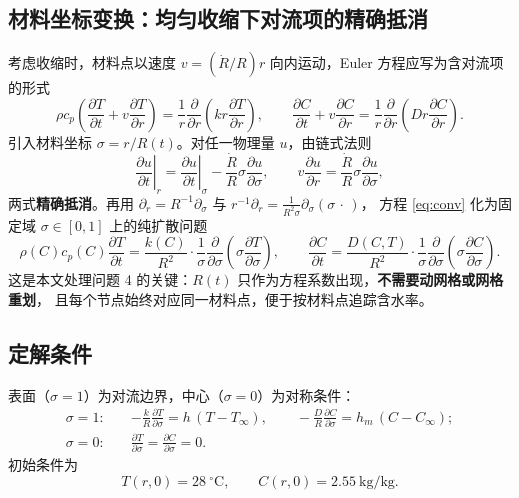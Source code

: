 \documentclass[12pt,a4paper]{ctexart}
\begin{document}
\subsection{材料坐标变换：均匀收缩下对流项的精确抵消}
考虑收缩时，材料点以速度 $v=(\dot R/R)r$ 向内运动，Euler 方程应写为含对流项的形式
\begin{equation}
\rho c_p\!\left(\frac{\partial T}{\partial t}+v\frac{\partial T}{\partial r}\right)
=\frac{1}{r}\frac{\partial}{\partial r}\!\left(k r\frac{\partial T}{\partial r}\right),
\qquad
\frac{\partial C}{\partial t}+v\frac{\partial C}{\partial r}
=\frac{1}{r}\frac{\partial}{\partial r}\!\left(D r\frac{\partial C}{\partial r}\right).
\label{eq:conv}
\end{equation}
引入材料坐标 $\sigma=r/R(t)$。对任一物理量 $u$，由链式法则
\begin{equation}
\left.\frac{\partial u}{\partial t}\right|_{r}
=\left.\frac{\partial u}{\partial t}\right|_{\sigma}
-\frac{\dot R}{R}\sigma\frac{\partial u}{\partial\sigma},
\qquad
v\frac{\partial u}{\partial r}=\frac{\dot R}{R}\sigma\frac{\partial u}{\partial\sigma},
\label{eq:cancel}
\end{equation}
两式\textbf{精确抵消}。再用 $\partial_r=R^{-1}\partial_\sigma$ 与
$r^{-1}\partial_r=\frac{1}{R^2\sigma}\partial_\sigma(\sigma\,\cdot\,)$，
方程 \eqref{eq:conv} 化为固定域 $\sigma\in[0,1]$ 上的纯扩散问题
\begin{equation}
\rho(C)c_p(C)\frac{\partial T}{\partial t}
=\frac{k(C)}{R^2}\cdot\frac{1}{\sigma}\frac{\partial}{\partial\sigma}
\!\left(\sigma\frac{\partial T}{\partial\sigma}\right),
\qquad
\frac{\partial C}{\partial t}
=\frac{D(C,T)}{R^2}\cdot\frac{1}{\sigma}\frac{\partial}{\partial\sigma}
\!\left(\sigma\frac{\partial C}{\partial\sigma}\right).
\label{eq:material}
\end{equation}
这是本文处理问题 4 的关键：$R(t)$ 只作为方程系数出现，\textbf{不需要动网格或网格重划}，
且每个节点始终对应同一材料点，便于按材料点追踪含水率。

\subsection{定解条件}
表面（$\sigma=1$）为对流边界，中心（$\sigma=0$）为对称条件：
\begin{equation}
\begin{aligned}
\sigma=1:\quad &-\frac{k}{R}\frac{\partial T}{\partial\sigma}=h\,(T-T_\infty),
\qquad -\frac{D}{R}\frac{\partial C}{\partial\sigma}=h_m\,(C-C_\infty);\\
\sigma=0:\quad &\frac{\partial T}{\partial\sigma}=\frac{\partial C}{\partial\sigma}=0.
\end{aligned}
\label{eq:bc}
\end{equation}
初始条件为
\begin{equation}
T(r,0)=28\ ^\circ\text{C},\qquad C(r,0)=2.55\ \text{kg/kg}.
\label{eq:ic}
\end{equation}
\end{document}
